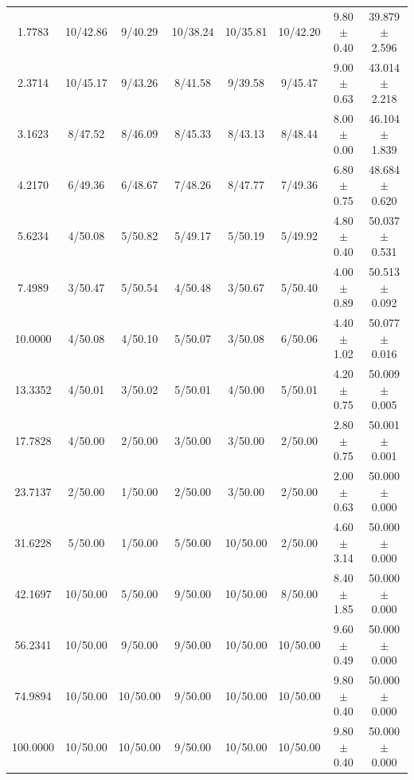 \begin{longtable}{c c c c c c c c}
1.7783 & 10/42.86 & 9/40.29 & 10/38.24 & 10/35.81 & 10/42.20 & 9.80 $\pm$ 0.40 & 39.879 $\pm$ 2.596 \\
2.3714 & 10/45.17 & 9/43.26 & 8/41.58 & 9/39.58 & 9/45.47 & 9.00 $\pm$ 0.63 & 43.014 $\pm$ 2.218 \\
3.1623 & 8/47.52 & 8/46.09 & 8/45.33 & 8/43.13 & 8/48.44 & 8.00 $\pm$ 0.00 & 46.104 $\pm$ 1.839 \\
4.2170 & 6/49.36 & 6/48.67 & 7/48.26 & 8/47.77 & 7/49.36 & 6.80 $\pm$ 0.75 & 48.684 $\pm$ 0.620 \\
5.6234 & 4/50.08 & 5/50.82 & 5/49.17 & 5/50.19 & 5/49.92 & 4.80 $\pm$ 0.40 & 50.037 $\pm$ 0.531 \\
7.4989 & 3/50.47 & 5/50.54 & 4/50.48 & 3/50.67 & 5/50.40 & 4.00 $\pm$ 0.89 & 50.513 $\pm$ 0.092 \\
10.0000 & 4/50.08 & 4/50.10 & 5/50.07 & 3/50.08 & 6/50.06 & 4.40 $\pm$ 1.02 & 50.077 $\pm$ 0.016 \\
13.3352 & 4/50.01 & 3/50.02 & 5/50.01 & 4/50.00 & 5/50.01 & 4.20 $\pm$ 0.75 & 50.009 $\pm$ 0.005 \\
17.7828 & 4/50.00 & 2/50.00 & 3/50.00 & 3/50.00 & 2/50.00 & 2.80 $\pm$ 0.75 & 50.001 $\pm$ 0.001 \\
23.7137 & 2/50.00 & 1/50.00 & 2/50.00 & 3/50.00 & 2/50.00 & 2.00 $\pm$ 0.63 & 50.000 $\pm$ 0.000 \\
31.6228 & 5/50.00 & 1/50.00 & 5/50.00 & 10/50.00 & 2/50.00 & 4.60 $\pm$ 3.14 & 50.000 $\pm$ 0.000 \\
42.1697 & 10/50.00 & 5/50.00 & 9/50.00 & 10/50.00 & 8/50.00 & 8.40 $\pm$ 1.85 & 50.000 $\pm$ 0.000 \\
56.2341 & 10/50.00 & 9/50.00 & 9/50.00 & 10/50.00 & 10/50.00 & 9.60 $\pm$ 0.49 & 50.000 $\pm$ 0.000 \\
74.9894 & 10/50.00 & 10/50.00 & 9/50.00 & 10/50.00 & 10/50.00 & 9.80 $\pm$ 0.40 & 50.000 $\pm$ 0.000 \\
100.0000 & 10/50.00 & 10/50.00 & 9/50.00 & 10/50.00 & 10/50.00 & 9.80 $\pm$ 0.40 & 50.000 $\pm$ 0.000 \\
\end{longtable}
